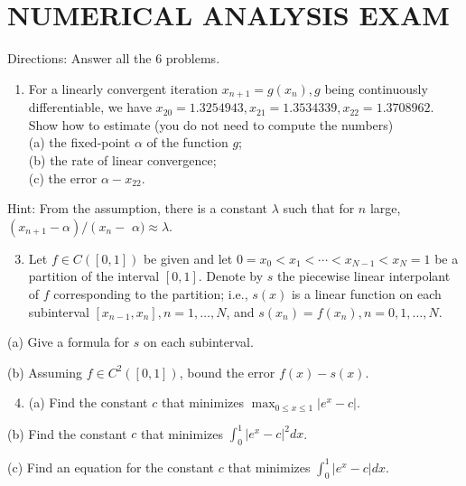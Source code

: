 \documentclass[10pt]{article}
\begin{document}
\section{NUMERICAL ANALYSIS EXAM}
Directions: Answer all the 6 problems.

\begin{enumerate}
  \item For a linearly convergent iteration $x_{n+1}=g\left(x_{n}\right), g$ being continuously differentiable, we have $x_{20}=1.3254943, x_{21}=1.3534339, x_{22}=1.3708962$. Show how to estimate (you do not need to compute the numbers)\\
(a) the fixed-point $\alpha$ of the function $g$;\\
(b) the rate of linear convergence;\\
(c) the error $\alpha-x_{22}$.
\end{enumerate}
Hint: From the assumption, there is a constant $\lambda$ such that for $n$ large, $\left(x_{n+1}-\alpha\right) /\left(x_{n}-\right.$ $\alpha) \approx \lambda$.

\begin{enumerate}
  \setcounter{enumi}{2}
  \item Let $f \in C([0,1])$ be given and let $0=x_{0}<x_{1}<\cdots<x_{N-1}<x_{N}=1$ be a partition of the interval $[0,1]$. Denote by $s$ the piecewise linear interpolant of $f$ corresponding to the partition; i.e., $s(x)$ is a linear function on each subinterval $\left[x_{n-1}, x_{n}\right], n=1, \ldots, N$, and $s\left(x_{n}\right)=f\left(x_{n}\right), n=0,1, \ldots, N$.
\end{enumerate}
(a) Give a formula for $s$ on each subinterval.

(b) Assuming $f \in C^{2}([0,1])$, bound the error $f(x)-s(x)$.

\begin{enumerate}
  \setcounter{enumi}{3}
  \item (a) Find the constant $c$ that minimizes $\max _{0 \leq x \leq 1}\left|e^{x}-c\right|$.
\end{enumerate}
(b) Find the constant $c$ that minimizes $\int_{0}^{1}\left|e^{x}-c\right|^{2} d x$.

(c) Find an equation for the constant $c$ that minimizes $\int_{0}^{1}\left|e^{x}-c\right| d x$.
\end{document}
